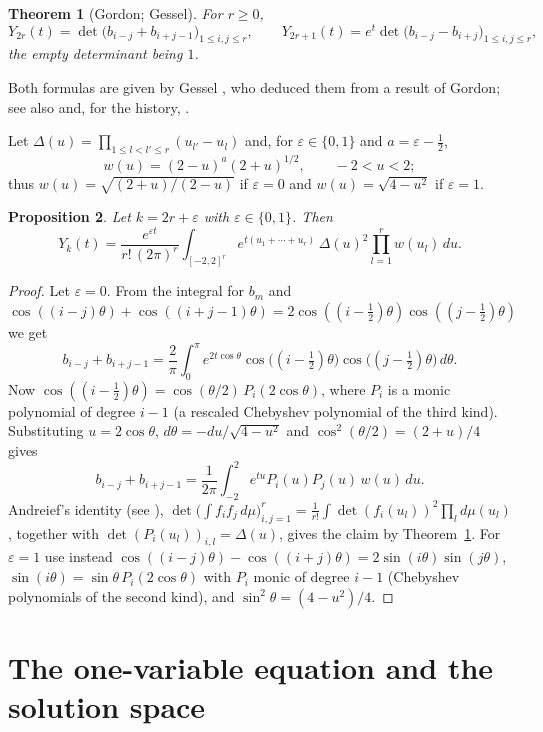 \documentclass[11pt,a4paper]{article}
\newtheorem{theorem}{Theorem}[section]
\newtheorem{proposition}[theorem]{Proposition}
\theoremstyle{definition}
\theoremstyle{remark}
\numberwithin{equation}{section}
\begin{document}
\begin{theorem}[Gordon; Gessel]\label{bfk:thm:det}
For $r\ge0$,
\[
Y_{2r}(t)=\det\bigl(b_{i-j}+b_{i+j-1}\bigr)_{1\le i,j\le r},\qquad
Y_{2r+1}(t)=e^{t}\det\bigl(b_{i-j}-b_{i+j}\bigr)_{1\le i,j\le r},
\]
the empty determinant being $1$.
\end{theorem}

Both formulas are given by Gessel \cite{Ges90}, who deduced them from a result of Gordon; see also \cite{BG00} and, for the history, \cite{Mis19}.

Let $\Delta(u)=\prod_{1\le l<l'\le r}(u_{l'}-u_l)$ and, for $\varepsilon\in\{0,1\}$ and $a=\varepsilon-\frac12$,
\[
w(u)=(2-u)^{a}(2+u)^{1/2},\qquad -2<u<2;
\]
thus $w(u)=\sqrt{(2+u)/(2-u)}$ if $\varepsilon=0$ and $w(u)=\sqrt{4-u^2}$ if $\varepsilon=1$.

\begin{proposition}\label{bfk:prop:int}
Let $k=2r+\varepsilon$ with $\varepsilon\in\{0,1\}$. Then
\[
Y_k(t)=\frac{e^{\varepsilon t}}{r!\,(2\pi)^r}\int_{[-2,2]^r}e^{t(u_1+\cdots+u_r)}\,\Delta(u)^2\prod_{l=1}^rw(u_l)\,du .
\]
\end{proposition}

\begin{proof}
Let $\varepsilon=0$. From the integral for $b_m$ and $\cos((i-j)\theta)+\cos((i+j-1)\theta)=2\cos((i-\frac12)\theta)\cos((j-\frac12)\theta)$ we get
\[
b_{i-j}+b_{i+j-1}=\frac2\pi\int_0^\pi e^{2t\cos\theta}\cos\bigl((i-\tfrac12)\theta\bigr)\cos\bigl((j-\tfrac12)\theta\bigr)\,d\theta .
\]
Now $\cos((i-\frac12)\theta)=\cos(\theta/2)\,P_i(2\cos\theta)$, where $P_i$ is a monic polynomial of degree $i-1$ (a rescaled Chebyshev polynomial of the third kind). Substituting $u=2\cos\theta$, $d\theta=-du/\sqrt{4-u^2}$ and $\cos^2(\theta/2)=(2+u)/4$ gives
\[
b_{i-j}+b_{i+j-1}=\frac1{2\pi}\int_{-2}^2e^{tu}P_i(u)P_j(u)\,w(u)\,du .
\]
Andreief's identity (see \cite{For10}), $\det\bigl(\int f_if_j\,d\mu\bigr)_{i,j=1}^r=\frac1{r!}\int\det(f_i(u_l))^2\prod_ld\mu(u_l)$, together with $\det(P_i(u_l))_{i,l}=\Delta(u)$, gives the claim by Theorem~\ref{bfk:thm:det}. For $\varepsilon=1$ use instead $\cos((i-j)\theta)-\cos((i+j)\theta)=2\sin(i\theta)\sin(j\theta)$, $\sin(i\theta)=\sin\theta\,P_i(2\cos\theta)$ with $P_i$ monic of degree $i-1$ (Chebyshev polynomials of the second kind), and $\sin^2\theta=(4-u^2)/4$.
\end{proof}

\section{The one-variable equation and the solution space}\label{bfk:sec:V}
\end{document}
